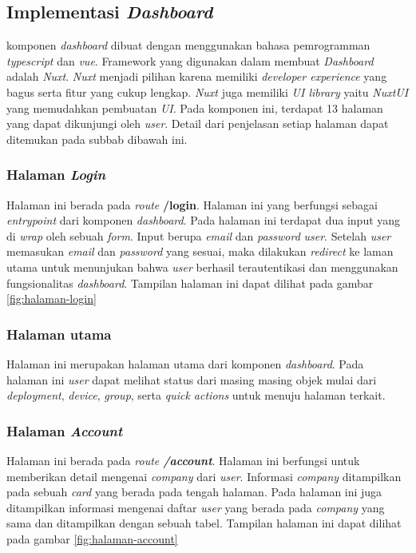 \subsection{Implementasi \textit{Dashboard}}
komponen \textit{dashboard} dibuat dengan menggunakan bahasa pemrogramman \textit{typescript} dan \textit{vue}. Framework yang digunakan dalam membuat \textit{Dashboard} adalah \textit{Nuxt}. \textit{Nuxt} menjadi pilihan karena memiliki \textit{developer experience} yang bagus serta fitur yang cukup lengkap. \textit{Nuxt} juga memiliki \textit{UI library} yaitu \textit{NuxtUI} yang memudahkan pembuatan \textit{UI}. Pada komponen ini, terdapat 13 halaman yang dapat dikunjungi oleh \textit{user}. Detail dari penjelasan setiap halaman dapat ditemukan pada subbab dibawah ini.

\subsubsection{Halaman \textit{Login}}
Halaman ini berada pada \textit{route} \textbf{/login}. Halaman ini yang berfungsi sebagai \textit{entrypoint} dari komponen \textit{dashboard}. Pada halaman ini terdapat dua input yang di \textit{wrap} oleh sebuah \textit{form}. Input berupa \textit{email} dan \textit{password} \textit{user}. Setelah \textit{user} memasukan \textit{email} dan \textit{password} yang sesuai, maka dilakukan \textit{redirect} ke laman utama untuk menunjukan bahwa \textit{user} berhasil terautentikasi dan menggunakan fungsionalitas \textit{dashboard}. Tampilan halaman ini dapat dilihat pada gambar \ref{fig:halaman-login}

\subsubsection{Halaman utama}
Halaman ini merupakan halaman utama dari komponen \textit{dashboard}. Pada halaman ini \textit{user} dapat melihat status dari masing masing objek mulai dari \textit{deployment}, \textit{device}, \textit{group}, serta \textit{quick actions} untuk menuju halaman terkait.

\subsubsection{Halaman \textit{Account}}
Halaman ini berada pada \textit{route \textbf{/account}}. Halaman ini berfungsi untuk memberikan detail mengenai \textit{company} dari \textit{user}. Informasi \textit{company} ditampilkan pada sebuah \textit{card} yang berada pada tengah halaman. Pada halaman ini juga ditampilkan informasi mengenai daftar \textit{user} yang berada pada \textit{company} yang sama dan ditampilkan dengan sebuah tabel. Tampilan halaman ini dapat dilihat pada gambar \ref{fig:halaman-account}

